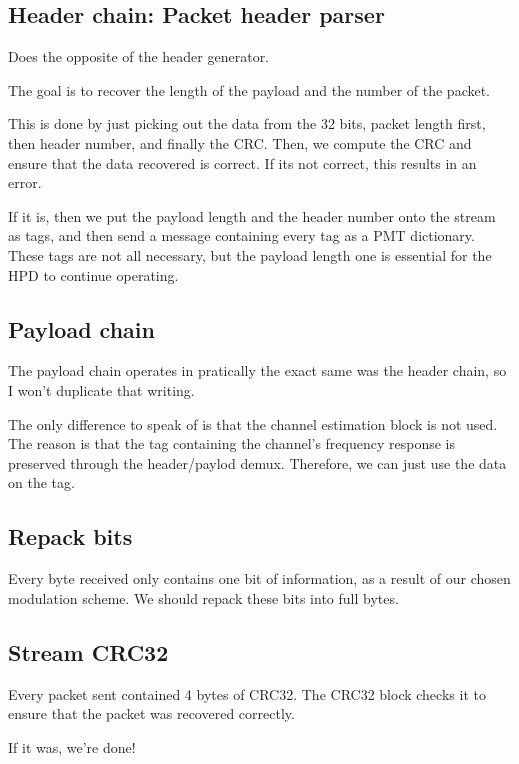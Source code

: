 \documentclass[11pt]{article}
\begin{document}
\subsection{Header chain: Packet header parser}
\label{sec:org4dea553}
Does the opposite of the header generator.

The goal is to recover the length of the payload and the number of the
packet.

This is done by just picking out the data from the 32 bits, packet
length first, then header number, and finally the CRC. Then, we
compute the CRC and ensure that the data recovered is correct. If
its not correct, this results in an error.

If it is, then we put the payload length and the header number onto
the stream as tags, and then send a message containing every tag as a
PMT dictionary. These tags are not all necessary, but the payload
length one is essential for the HPD to continue operating.
\subsection{Payload chain}
\label{sec:org2a81b56}
The payload chain operates in pratically the exact same was the header
chain, so I won't duplicate that writing.

The only difference to speak of is that the channel estimation block
is not used. The reason is that the tag containing the channel's
frequency response is preserved through the header/paylod
demux. Therefore, we can just use the data on the tag.
\subsection{Repack bits}
\label{sec:org35200f7}
Every byte received only contains one bit of information, as a result
of our chosen modulation scheme. We should repack these bits into full
bytes.
\subsection{Stream CRC32}
\label{sec:org42748bf}
Every packet sent contained 4 bytes of CRC32. The CRC32 block checks
it to ensure that the packet was recovered correctly.

If it was, we're done!
\end{document}
